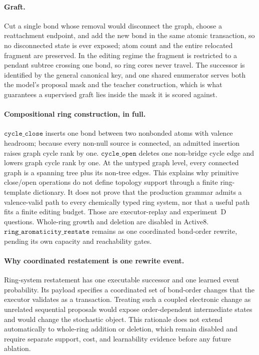 \documentclass{article}
\newcommand{\op}[1]{\texttt{#1}}
\theoremstyle{definition}
\theoremstyle{remark}
\begin{document}
\paragraph{Graft.}
Cut a single bond whose removal would disconnect the graph, choose a reattachment endpoint, and add the new bond in the same atomic transaction, so no disconnected state is ever exposed; atom count and the entire relocated fragment are preserved. In the editing regime the fragment is restricted to a pendant subtree crossing one bond, so ring cores never travel. The successor is identified by the general canonical key, and one shared enumerator serves both the model's proposal mask and the teacher construction, which is what guarantees a supervised graft lies inside the mask it is scored against.

\paragraph{Compositional ring construction, in full.}
$\op{cycle\_close}$ inserts one bond between two nonbonded atoms with valence headroom; because every non-null source is connected, an admitted insertion raises graph cycle rank by one. $\op{cycle\_open}$ deletes one non-bridge cycle edge and lowers graph cycle rank by one. At the untyped graph level, every connected graph is a spanning tree plus its non-tree edges. This explains why primitive close/open operations do not define topology support through a finite ring-template dictionary. It does not prove that the production grammar admits a valence-valid path to every chemically typed ring system, nor that a useful path fits a finite editing budget. Those are executor-replay and experiment~D questions. Whole-ring growth and deletion are disabled in Active8. $\op{ring\_aromaticity\_restate}$ remains as one coordinated bond-order rewrite, pending its own capacity and reachability gates.

\paragraph{Why coordinated restatement is one rewrite event.}
Ring-system restatement has one executable successor and one learned event probability. Its payload specifies a coordinated set of bond-order changes that the executor validates as a transaction. Treating such a coupled electronic change as unrelated sequential proposals would expose order-dependent intermediate states and would change the stochastic object. This rationale does not extend automatically to whole-ring addition or deletion, which remain disabled and require separate support, cost, and learnability evidence before any future ablation.
\end{document}
